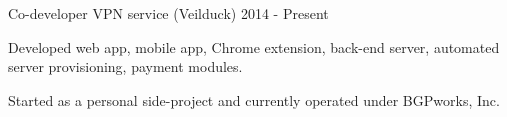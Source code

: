 

\begin{cventries}

  \cventry
    {Co-developer} %
    {VPN service (Veilduck)} %
    {} %
    {2014 - Present} %
    {
      \begin{cvitems} %
        \item {Developed web app, mobile app, Chrome extension, back-end server, automated server provisioning, payment modules.}
        \item {Started as a personal side-project and currently operated under BGPworks, Inc.}
      \end{cvitems}
    }

\end{cventries}
